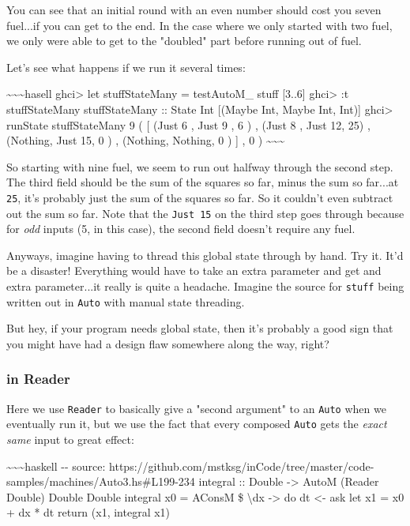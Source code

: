 \documentclass[]{article}
\begin{document}
You can see that an initial round with an even number should cost you seven
fuel...if you can get to the end. In the case where we only started with two
fuel, we only were able to get to the "doubled" part before running out of fuel.

Let's see what happens if we run it several times:

\textasciitilde{}\textasciitilde{}\textasciitilde{}hasell ghci\textgreater{} let
stuffStateMany = testAutoM\_ stuff {[}3..6{]} ghci\textgreater{} :t
stuffStateMany stuffStateMany :: State Int {[}(Maybe Int, Maybe Int, Int){]}
ghci\textgreater{} runState stuffStateMany 9 ( {[} (Just 6 , Just 9 , 6 ) ,
(Just 8 , Just 12, 25) , (Nothing, Just 15, 0 ) , (Nothing, Nothing, 0 ) {]} , 0
) \textasciitilde{}\textasciitilde{}\textasciitilde{}

So starting with nine fuel, we seem to run out halfway through the second step.
The third field should be the sum of the squares so far, minus the sum so
far...at \texttt{25}, it's probably just the sum of the squares so far. So it
couldn't even subtract out the sum so far. Note that the \texttt{Just\ 15} on
the third step goes through because for \emph{odd} inputs (5, in this case), the
second field doesn't require any fuel.

Anyways, imagine having to thread this global state through by hand. Try it.
It'd be a disaster! Everything would have to take an extra parameter and get and
extra parameter...it really is quite a headache. Imagine the source for
\texttt{stuff} being written out in \texttt{Auto} with manual state threading.

But hey, if your program needs global state, then it's probably a good sign that
you might have had a design flaw somewhere along the way, right?

\subsubsection{in Reader}

Here we use \texttt{Reader} to basically give a "second argument" to an
\texttt{Auto} when we eventually run it, but we use the fact that every composed
\texttt{Auto} gets the \emph{exact same} input to great effect:

\textasciitilde{}\textasciitilde{}\textasciitilde{}haskell -\/- source:
https://github.com/mstksg/inCode/tree/master/code-samples/machines/Auto3.hs\#L199-234
integral :: Double -\textgreater{} AutoM (Reader Double) Double Double integral
x0 = AConsM \$ \textbackslash{}dx -\textgreater{} do dt \textless{}- ask let x1
= x0 + dx * dt return (x1, integral x1)
\end{document}
